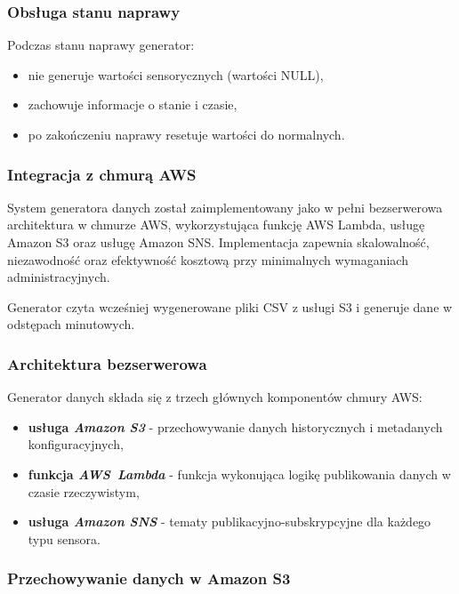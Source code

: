\subsubsection{Obsługa stanu naprawy}

Podczas stanu naprawy generator:
\begin{itemize}
    \item nie generuje wartości sensorycznych (wartości NULL),
    \item zachowuje informacje o stanie i czasie,
    \item po zakończeniu naprawy resetuje wartości do normalnych.
\end{itemize}

\subsubsection{Integracja z chmurą AWS}
\label{sec:integracja_aws}

System generatora danych został zaimplementowany jako w pełni bezserwerowa architektura w chmurze AWS, wykorzystująca funkcję AWS Lambda, usługę Amazon S3 oraz usługę Amazon SNS. Implementacja zapewnia skalowalność, niezawodność oraz efektywność kosztową przy minimalnych wymaganiach administracyjnych.

Generator czyta wcześniej wygenerowane pliki CSV z usługi S3 i generuje dane w odstępach minutowych.

\subsubsection{Architektura bezserwerowa}
\label{subsec:architektura_bezserwerowa}

Generator danych składa się z trzech głównych komponentów chmury AWS:

\begin{itemize}
    \item \textbf{usługa \textit{Amazon S3}} - przechowywanie danych historycznych i metadanych konfiguracyjnych,
    \item \textbf{funkcja \mbox{\textit{AWS Lambda}}} - funkcja wykonująca logikę publikowania danych w czasie rzeczywistym,
    \item \textbf{usługa \textit{Amazon SNS}} - tematy publikacyjno-subskrypcyjne dla każdego typu sensora.
\end{itemize}

\subsubsection{Przechowywanie danych w Amazon S3}
\label{subsec:amazon_s3}

